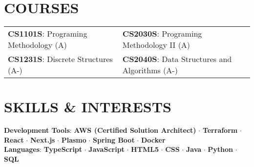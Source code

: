 \documentclass[letterpaper,11pt]{article}
\begin{document}
\section{COURSES}
\begin{tabularx}{\textwidth}{X X}
  \textbf{CS1101S}: Programing Methodology (A) & \textbf{CS2030S}: Programing Methodology II (A) \\
  \textbf{CS1231S}: Discrete Structures (A-) & \textbf{CS2040S}: Data Structures and Algorithms (A-) \\
\end{tabularx}

\section{SKILLS \& INTERESTS}
 \begin{itemize}[leftmargin=0.15in, label={}]
    \small{\item{
    \vspace{1mm}
    \textbf{Development Tools}{: \textbf{AWS (Certified Solution Architect)} {\bfseries\large$\cdot$} \textbf{Terraform} {\bfseries\large$\cdot$} \textbf{React} {\bfseries\large$\cdot$} \textbf{Next.js} {\bfseries\large$\cdot$} \textbf{Plasmo} {\bfseries\large$\cdot$} \textbf{Spring Boot} {\bfseries\large$\cdot$} \textbf{Docker}} \\
    \vspace{1mm}
    \textbf{Languages}{: \textbf{TypeScript} {\bfseries\large$\cdot$} \textbf{JavaScript} {\bfseries\large$\cdot$} \textbf{HTML5} {\bfseries\large$\cdot$} \textbf{CSS} {\bfseries\large$\cdot$} \textbf{Java} {\bfseries\large$\cdot$} \textbf{Python} {\bfseries\large$\cdot$} \textbf{SQL}} \\
    \vspace{1mm}

    }}
 \end{itemize}
 \begin{center}
\end{center}
\end{document}
